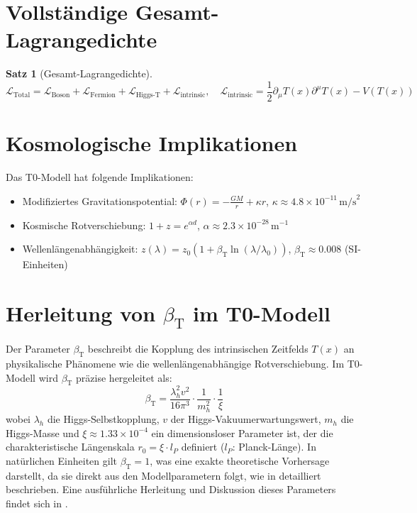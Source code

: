 \documentclass[12pt,a4paper]{article}
\newcommand{\Tfield}{T(x)}
\newcommand{\betaT}{\beta_{\text{T}}}
\newtheorem{theorem}{Satz}[section]
\theoremstyle{definition}
\theoremstyle{remark}
\begin{document}
	\section{Vollständige Gesamt-Lagrangedichte}
	\begin{theorem}[Gesamt-Lagrangedichte]
		\begin{equation}
			\mathcal{L}_{\text{Total}} = \mathcal{L}_{\text{Boson}} + \mathcal{L}_{\text{Fermion}} + \mathcal{L}_{\text{Higgs-T}} + \mathcal{L}_{\text{intrinsic}}, \quad \mathcal{L}_{\text{intrinsic}} = \frac{1}{2} \partial_\mu \Tfield \partial^\mu \Tfield - V(\Tfield)
		\end{equation}
	\end{theorem}
	
	\section{Kosmologische Implikationen}
	Das T0-Modell hat folgende Implikationen:
	\begin{itemize}
		\item Modifiziertes Gravitationspotential: \( \Phi(r) = -\frac{GM}{r} + \kappa r \), \( \kappa \approx 4.8 \times 10^{-11} \, \text{m/s}^2 \)
		\item Kosmische Rotverschiebung: \( 1 + z = e^{\alpha d} \), \( \alpha \approx 2.3 \times 10^{-28} \, \text{m}^{-1} \)
		\item Wellenlängenabhängigkeit: \( z(\lambda) = z_0 (1 + \betaT \ln(\lambda/\lambda_0)) \), \( \betaT \approx 0.008 \) (SI-Einheiten)
	\end{itemize}
	
	\section{Herleitung von \(\betaT\) im T0-Modell}
	Der Parameter \(\betaT\) beschreibt die Kopplung des intrinsischen Zeitfelds \(\Tfield\) an physikalische Phänomene wie die wellenlängenabhängige Rotverschiebung. Im T0-Modell wird \(\betaT\) präzise hergeleitet als:
	\begin{equation}
		\betaT = \frac{\lambda_h^2 v^2}{16\pi^3} \cdot \frac{1}{m_h^2} \cdot \frac{1}{\xi}
	\end{equation}
	wobei \(\lambda_h\) die Higgs-Selbstkopplung, \(v\) der Higgs-Vakuumerwartungswert, \(m_h\) die Higgs-Masse und \(\xi \approx 1.33 \times 10^{-4}\) ein dimensionsloser Parameter ist, der die charakteristische Längenskala \(r_0 = \xi \cdot l_P\) definiert (\(l_P\): Planck-Länge). In natürlichen Einheiten gilt \(\betaT = 1\), was eine exakte theoretische Vorhersage darstellt, da sie direkt aus den Modellparametern folgt, wie in \cite{pascher_alphabeta_2025} detailliert beschrieben. Eine ausführliche Herleitung und Diskussion dieses Parameters findet sich in \cite{pascher_alphabeta_2025}.
	
\end{document}
